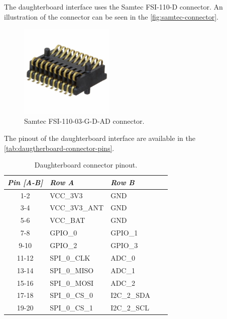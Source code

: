 The daughterboard interface uses the Samtec FSI-110-D connector. An illustration of the connector can be seen in the \autoref{fig:samtec-connector}.

\begin{figure}[!ht]
    \begin{center}
        \includegraphics[width=0.4\textwidth]{figures/samtec_fsi-110-03-g-d-ad.jpeg}
        \caption{Samtec FSI-110-03-G-D-AD connector.}
        \label{fig:samtec-connector}
    \end{center}
\end{figure}

The pinout of the daughterboard interface are available in the \autoref{tab:daugtherboard-connector-pins}.

\begin{table}[!h]
    \centering
    \begin{tabular}{cllll}
        \toprule[1.5pt]
        \textit{Pin [A-B]} & \textit{Row A} & \textit{Row B} \\
        \midrule
        1-2                & VCC\_3V3       & GND            \\
        3-4                & VCC\_3V3\_ANT  & GND            \\
        5-6                & VCC\_BAT       & GND            \\
        7-8                & GPIO\_0        & GPIO\_1        \\
        9-10               & GPIO\_2        & GPIO\_3        \\
        11-12              & SPI\_0\_CLK    & ADC\_0         \\
        13-14              & SPI\_0\_MISO   & ADC\_1         \\
        15-16              & SPI\_0\_MOSI   & ADC\_2         \\
        17-18              & SPI\_0\_CS\_0  & I2C\_2\_SDA    \\
        19-20              & SPI\_0\_CS\_1  & I2C\_2\_SCL    \\
        \bottomrule[1.5pt]
    \end{tabular}
    \caption{Daughterboard connector pinout.}
    \label{tab:daugtherboard-connector-pins}
\end{table}

